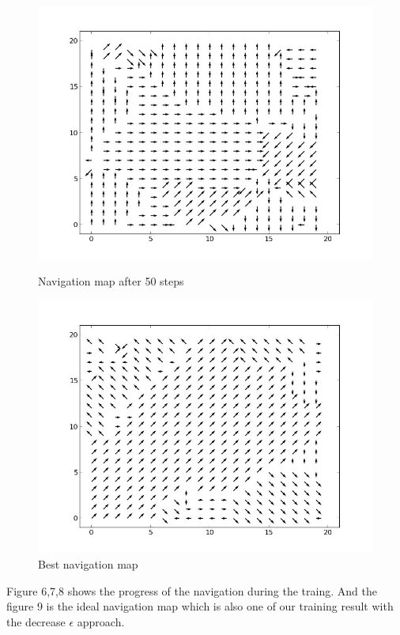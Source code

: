 \documentclass[a4paper, 11pt]{article}
\begin{document}
\begin{figure}
\begin{minipage}[c]{0.5\textwidth}
    \includegraphics[scale=0.3]{../figure/navMp50.jpeg}
  \caption{Navigation map after 50 steps}
  \end{minipage}%
  \begin{minipage}[c]{0.5\textwidth}
    \centering
    \includegraphics[scale=0.3]{../figure/navMap.jpeg}
  \caption{Best navigation map}
  \end{minipage}
\end{figure}

Figure 6,7,8 shows the progress of the navigation during the traing. And the figure 9 is the ideal navigation map which is also one of our training result with the decrease $\epsilon$ approach.
\end{document}
